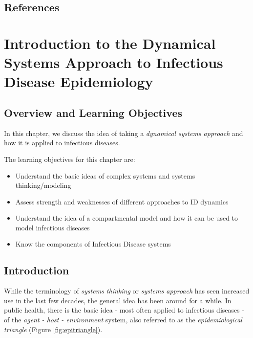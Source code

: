\documentclass[]{book}
\providecommand{\tightlist}{%
  \setlength{\itemsep}{0pt}\setlength{\parskip}{0pt}}
\theoremstyle{definition}
\theoremstyle{definition}
\theoremstyle{definition}
\theoremstyle{remark}
\begin{document}
\section{References}\label{references}

\chapter{Introduction to the Dynamical Systems Approach to Infectious
Disease
Epidemiology}\label{introduction-to-the-dynamical-systems-approach-to-infectious-disease-epidemiology}

\section{Overview and Learning
Objectives}\label{overview-and-learning-objectives}

In this chapter, we discuss the idea of taking a \emph{dynamical systems
approach} and how it is applied to infectious diseases.

The learning objectives for this chapter are:

\begin{itemize}
\tightlist
\item
  Understand the basic ideas of complex systems and systems
  thinking/modeling
\item
  Assess strength and weaknesses of different approaches to ID dynamics
\item
  Understand the idea of a compartmental model and how it can be used to
  model infectious diseases
\item
  Know the components of Infectious Disease systems
\end{itemize}

\section{Introduction}\label{introduction}

While the terminology of \emph{systems thinking} or \emph{systems
approach} has seen increased use in the last few decades, the general
idea has been around for a while. In public health, there is the basic
idea - most often applied to infectious diseases - of the \emph{agent -
host - environment} system, also referred to as the
\emph{epidemiological triangle} (Figure \ref{fig:epitriangle}).
\end{document}
